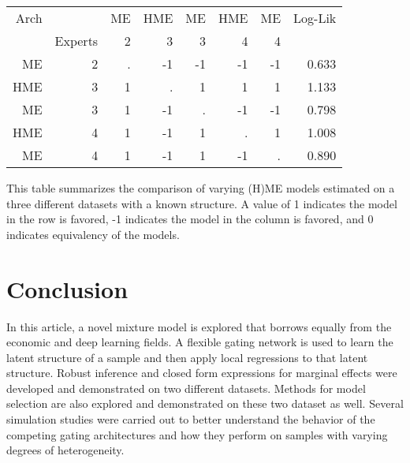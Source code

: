 \documentclass[12pt]{article}
\theoremstyle{definition}
\begin{document}
\begin{table}[t!]
\begin{threeparttable}
\begin{tabular}[l]{r r r r r r r r}
      \hline
      Arch    &         & ME    & HME   & ME    & HME   & ME  & Log-Lik \\
              & Experts & 2     & 3     & 3     & 4     & 4   &         \\
      \hline
      ME      & 2       & .     & -1    & -1    & -1    & -1  & 0.633   \\
      HME     & 3       & 1     & .     & 1     &  1    & 1   & 1.133   \\
      ME      & 3       & 1     & -1    & .     & -1    & -1  & 0.798   \\
      HME     & 4       & 1     & -1    & 1     & .     & 1   & 1.008   \\
      ME      & 4       & 1     & -1    & 1     & -1    & .   & 0.890   \\
      \hline
    \end{tabular}
    \begin{tablenotes}
      \item{\footnotesize This table summarizes the comparison of varying (H)ME models estimated on a three different datasets with a known structure. A value of 1 indicates the model in the row is favored, -1 indicates the model in the column is favored, and 0 indicates equivalency of the models.}
    \end{tablenotes} \label{tbl:monte_carlo_voung_results}
  \end{threeparttable}
\end{table}

\clearpage

\section{Conclusion} \label{sec:Conclusion}

In this article, a novel mixture model is explored that borrows equally from the economic and deep learning fields. A flexible gating network is used to learn the latent structure of a sample and then apply local regressions to that latent structure. Robust inference and closed form expressions for marginal effects were developed and demonstrated on two different datasets. Methods for model selection are also explored and demonstrated on these two dataset as well. Several simulation studies were  carried out to better understand the behavior of the competing gating architectures and how they perform on samples with varying degrees of heterogeneity.



\clearpage

\printbibliography
\end{document}
